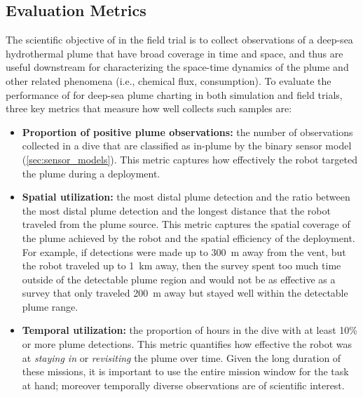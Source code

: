 \subsection{Evaluation Metrics}
\label{sec:eval_metrics}
The scientific objective of \Sentry in the field trial is to collect observations of a deep-sea hydrothermal plume that have broad coverage in time and space, and thus are useful downstream for characterizing the space-time dynamics of the plume and other related phenomena (i.e., chemical flux, consumption). To evaluate the performance of \PHORTEX for deep-sea plume charting in both simulation and field trials, three key metrics that measure how well \Sentry collects such samples are:
\begin{itemize}
    \item \textbf{Proportion of positive plume observations:} the number of observations collected in a dive that are classified as in-plume by the binary sensor model (\cref{sec:sensor_models}). This metric captures how effectively the robot targeted the plume during a deployment.
    \item \textbf{Spatial utilization:} the most distal plume detection and the ratio between the most distal plume detection and the longest distance that the robot traveled from the plume source. This metric captures the spatial coverage of the plume achieved by the robot and the spatial efficiency of the deployment. For example, if detections were made up to \SI{300}{\meter} away from the vent, but the robot traveled up to \SI{1}{\km} away, then the survey spent too much time outside of the detectable plume region and would not be as effective as a survey that only traveled \SI{200}{\meter} away but stayed well within the detectable plume range. 
    \item \textbf{Temporal utilization:} the proportion of hours in the dive with at least 10\% or more plume detections. This metric quantifies how effective the robot was at \emph{staying in} or \emph{revisiting} the plume over time. Given the long duration of these missions, it is important to use the entire mission window for the task at hand; moreover temporally diverse observations are of scientific interest.
\end{itemize}


